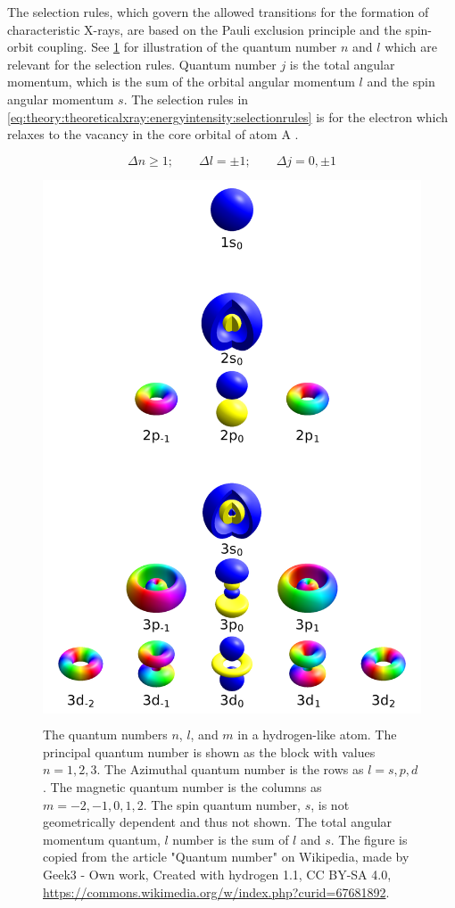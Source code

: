 The selection rules, which govern the allowed transitions for the formation of characteristic X-rays, are based on the Pauli exclusion principle and the spin-orbit coupling.
See \cref{fig:theory:theoreticalxray:energyintensity:quantumnumbers} for illustration of the quantum number $n$ and $l$ which are relevant for the selection rules.
Quantum number $j$ is the total angular momentum, which is the sum of the orbital angular momentum $l$ and the spin angular momentum $s$.
The selection rules in \cref{eq:theory:theoreticalxray:energyintensity:selectionrules} is for the electron which relaxes to the vacancy in the core orbital of atom A \cite[Sec. 8.2.2.2]{hollas_modern_2004}.

\begin{equation}
    \label{eq:theory:theoreticalxray:energyintensity:selectionrules}
    \Delta n \ge 1;\qquad \Delta l  = \pm 1;\qquad \Delta j = 0, \pm 1
\end{equation}

\begin{figure}
    \centering
    \colorbox{white}{\includegraphics[width=0.5\linewidth]{figures/wikipedia-quantum-numbers-n-l-j.png}}
    \caption{
        The quantum numbers $n$, $l$, and $m$ in a hydrogen-like atom.
        The principal quantum number is shown as the block with values $n= 1, 2, 3$.
        The Azimuthal quantum number is the rows as $l = s, p, d$.
        The magnetic quantum number is the columns as $m = -2, -1, 0, 1, 2 $.
        The spin quantum number, $s$, is not geometrically dependent and thus not shown.
        The total angular momentum quantum, $l$ number is the sum of $l$ and $s$.
        The figure is copied from the article "Quantum number" on Wikipedia, made by Geek3 - Own work, Created with hydrogen 1.1, CC BY-SA 4.0, \url{https://commons.wikimedia.org/w/index.php?curid=67681892}.
    }
    \label{fig:theory:theoreticalxray:energyintensity:quantumnumbers}
\end{figure}


